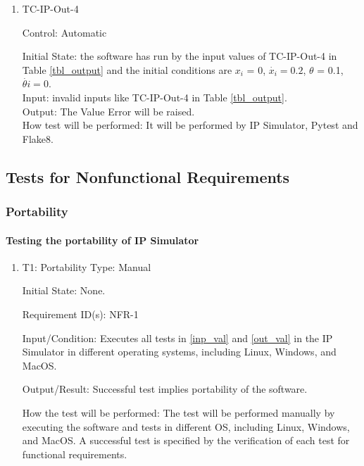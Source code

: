 \documentclass[12pt, titlepage]{article}
\begin{document}
\begin{enumerate}
\item{TC-IP-Out-4}

Control: Automatic
					
Initial State: the software has run by the input values of TC-IP-Out-4 in Table \ref{tbl_output} and the initial conditions are $x_i$ = 0, $\dot{x_i} = 0.2$, $\theta$ = 0.1, $\dot{\theta{i}}=0$.\\				
Input: invalid inputs like TC-IP-Out-4 in Table \ref{tbl_output}.\\	
Output: The Value Error will be raised.\\
How test will be performed: It will be performed by IP Simulator, Pytest and Flake8.

\end{enumerate}

\subsection{Tests for Nonfunctional Requirements}

\subsubsection{Portability\label{nfr1}}

\paragraph{Testing the portability of IP Simulator}

\begin{enumerate}

\item{T1: Portability}
\vspace{3mm}
\newline
Type: Manual
					
Initial State: None. 

Requirement ID(s): NFR-1					

Input/Condition: Executes all tests in \ref{inp_val} and \ref{out_val} in the IP Simulator in different operating systems, including Linux, Windows, and MacOS.
					
Output/Result: Successful test implies portability of the software.

How the test will be performed: The test will be performed manually by executing the software and tests in different OS, including Linux, Windows, and MacOS. A successful test is specified by the verification of
each test for functional requirements. 
				
\end{enumerate}
\end{document}
